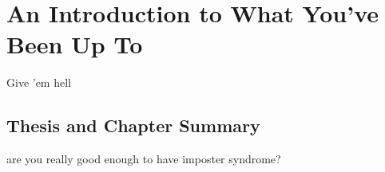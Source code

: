 \chapter{An Introduction to What You've Been Up To}
\setcounter{page}{1}
\label{chap:introduction}

\begin{chapquote}  {}
	Give 'em hell
\end{chapquote}

\section{Thesis and Chapter Summary}

are you really good enough to have imposter syndrome?
